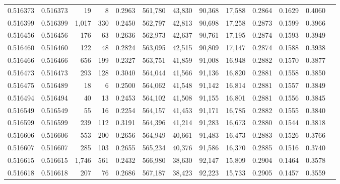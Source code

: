 \begin{tabular}{rrrrrrrrrrrrr}
0.516373 & 0.516373 &    19 &     8 &                                     0.2963 & 561,780 &  43,830 &  90,368 &  17,588 & 0.2864 & 0.1629 & 0.4060 \\
0.516399 & 0.516399 & 1,017 &   330 &                                     0.2450 & 562,797 &  42,813 &  90,698 &  17,258 & 0.2873 & 0.1599 & 0.3966 \\
0.516456 & 0.516456 &   176 &    63 &                                     0.2636 & 562,973 &  42,637 &  90,761 &  17,195 & 0.2874 & 0.1593 & 0.3949 \\
0.516460 & 0.516460 &   122 &    48 &                                     0.2824 & 563,095 &  42,515 &  90,809 &  17,147 & 0.2874 & 0.1588 & 0.3938 \\
0.516466 & 0.516466 &   656 &   199 &                                     0.2327 & 563,751 &  41,859 &  91,008 &  16,948 & 0.2882 & 0.1570 & 0.3877 \\
0.516473 & 0.516473 &   293 &   128 &                                     0.3040 & 564,044 &  41,566 &  91,136 &  16,820 & 0.2881 & 0.1558 & 0.3850 \\
0.516475 & 0.516489 &    18 &     6 &                                     0.2500 & 564,062 &  41,548 &  91,142 &  16,814 & 0.2881 & 0.1557 & 0.3849 \\
0.516494 & 0.516494 &    40 &    13 &                                     0.2453 & 564,102 &  41,508 &  91,155 &  16,801 & 0.2881 & 0.1556 & 0.3845 \\
0.516549 & 0.516549 &    55 &    16 &                                     0.2254 & 564,157 &  41,453 &  91,171 &  16,785 & 0.2882 & 0.1555 & 0.3840 \\
0.516599 & 0.516599 &   239 &   112 &                                     0.3191 & 564,396 &  41,214 &  91,283 &  16,673 & 0.2880 & 0.1544 & 0.3818 \\
0.516606 & 0.516606 &   553 &   200 &                                     0.2656 & 564,949 &  40,661 &  91,483 &  16,473 & 0.2883 & 0.1526 & 0.3766 \\
0.516607 & 0.516607 &   285 &   103 &                                     0.2655 & 565,234 &  40,376 &  91,586 &  16,370 & 0.2885 & 0.1516 & 0.3740 \\
0.516615 & 0.516615 & 1,746 &   561 &                                     0.2432 & 566,980 &  38,630 &  92,147 &  15,809 & 0.2904 & 0.1464 & 0.3578 \\
0.516618 & 0.516618 &   207 &    76 &                                     0.2686 & 567,187 &  38,423 &  92,223 &  15,733 & 0.2905 & 0.1457 & 0.3559 \\

\end{tabular}
